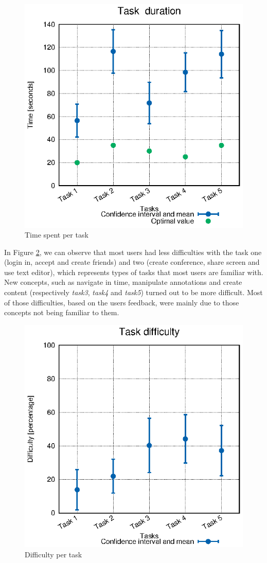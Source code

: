 \documentclass[10pt,conference]{IEEEtran}
\begin{document}
\begin{figure}
  \centering
    \includegraphics[width=0.75\linewidth]{stats/user_times.eps}
    \caption{Time spent per task}
    \label{fig:user_times}
\end{figure}

In Figure \ref{fig:user_diffs}, we can observe that most users had less difficulties with the task one (login in, accept and create friends) and two (create conference, share screen and use text editor), which represents types of tasks that most users are familiar with.
New concepts, such as navigate in time, manipulate annotations and create content (respectively \emph{task3}, \emph{task4} and \emph{task5}) turned out to be more difficult.
 Most of those difficulties, based on the users feedback, were mainly due to those concepts not being familiar to them.


\begin{figure}
  \centering
    \includegraphics[width=0.75\linewidth]{stats/user_diffs.eps}
  \caption{Difficulty per task}
  \label{fig:user_diffs}
\end{figure}
\end{document}

